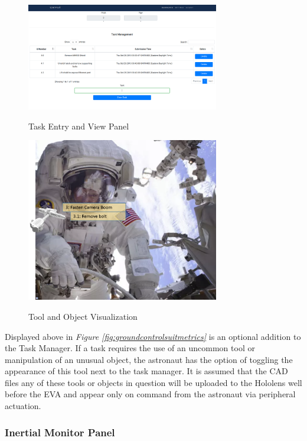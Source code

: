 \documentclass{article}
\let\Oldsubsubsection\subsubsection
\renewcommand{\subsubsection}{\FloatBarrier\Oldsubsubsection}
\begin{document}
\begin{figure}[!htb]
  \centering
  \caption{Task Entry and View Panel}
  \includegraphics[width=0.75\textwidth]{assets/taskmanagment.png}
  \label{fig:taskmanagment}
\end{figure}

\begin{figure}[!htb]
  \centering
  \caption{Tool and Object Visualization}
  \includegraphics[width=0.75\textwidth]{assets/subtask.png}
  \label{fig:subtask}
\end{figure}

Displayed above in \textit{Figure \ref{fig:groundcontrolsuitmetrics}} is an optional addition to the Task Manager. If a task requires the use of an uncommon tool or manipulation of an unusual object, the astronaut has the option of toggling the appearance of this tool next to the task manager. It is assumed that the CAD files any of these tools or objects in question will be uploaded to the Hololens well before the EVA and appear only on command from the astronaut via peripheral actuation.

\subsubsection{Inertial Monitor Panel}
\end{document}
